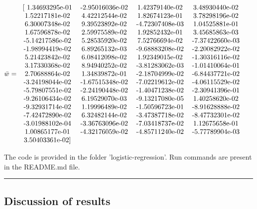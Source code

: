 \documentclass[a4paper]{article}
\begin{document}
$\bar{w} =
	\begin{tabular}{  c c c c c c  } 
		[ 1.34693295e-01 & -2.95016036e-02 &  1.42379140e-02 &  3.48930440e-02 \\
		  1.52217181e-02 &  4.42212544e-02 &  1.82674123e-01 &  3.78298196e-02 \\
		  6.30007348e-02 &  9.39523892e-02 & -4.72307408e-03 &  1.04525881e-01 \\
		  1.67596878e-02 &  2.59975589e-02 &  1.92852432e-01 &  3.45685863e-03 \\
		 -5.14217586e-02 &  5.28535920e-02 &  7.52766694e-02 & -7.37422660e-03 \\
		 -1.98994419e-02 &  6.89265132e-03 & -9.68883208e-02 & -2.20082922e-02 \\
		  5.21423842e-02 &  6.08412098e-02 &  1.92349015e-02 & -1.30316116e-02 \\
		  3.17330368e-02 &  8.94940252e-02 & -3.81283062e-03 & -1.01410064e-01 \\
		  2.70688864e-02 &  1.34839872e-01 & -2.18704999e-02 & -6.84437721e-02 \\
		 -3.24198044e-02 & -1.67515348e-02 & -7.02219612e-02 & -4.06115529e-02 \\
		 -5.79807551e-02 & -2.24190448e-02 & -1.40471238e-02 & -2.30941396e-01 \\
		 -9.26106434e-02 &  6.19529070e-03 & -9.13217080e-05 &  1.40258620e-02 \\
		 -9.32931714e-02 &  1.19996489e-02 & -1.50596723e-01 & -8.91628888e-02 \\
		 -7.42472890e-02 &  6.32482144e-02 & -3.47387718e-02 & -8.47732301e-02 \\
		 -3.01988102e-04 & -3.36763096e-02 & -7.03418737e-02 &  1.12675658e-01 \\
		  1.00865177e-01 & -4.32176059e-02 & -4.85711240e-02 & -5.77789904e-03 \\
		  3.50403361e-02] & & & \\
	\end{tabular}$

The code is provided in the folder 'logistic-regression'. Run commands are present in the README.md file.

\begin{center}
	\noindent\rule{4cm}{0.4pt}
\end{center}

\subsection{Discussion of results}
\end{document}

